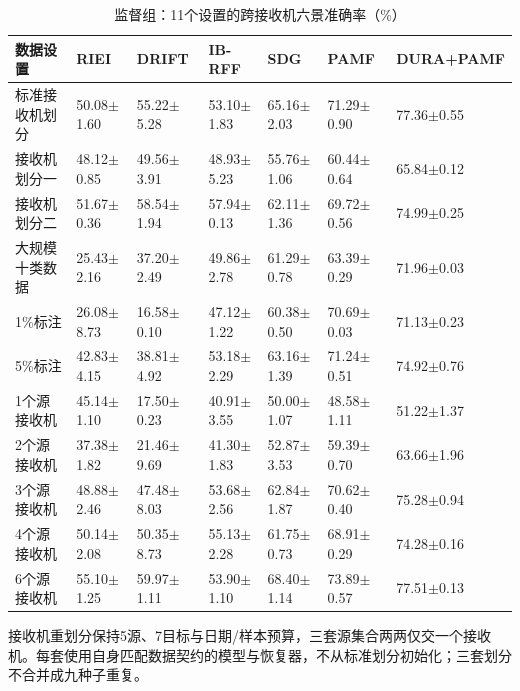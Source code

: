 \documentclass[10pt,journal]{IEEEtran}
\begin{document}
\begin{table}[!tbp]
\caption{监督组：11个设置的跨接收机六景准确率（\%）}
\label{tab:grouped-5}
\centering
\small
\begin{tabularx}{\textwidth}{YYYYYYY}
\toprule
\textbf{数据设置} & \textbf{RIEI} & \textbf{DRIFT} & \textbf{IB-RFF} & \textbf{SDG} & \textbf{PAMF} & \textbf{DURA+PAMF} \\
\midrule
标准接收机划分 & 50.08\ensuremath{\pm}1.60 & 55.22\ensuremath{\pm}5.28 & 53.10\ensuremath{\pm}1.83 & 65.16\ensuremath{\pm}2.03 & 71.29\ensuremath{\pm}0.90 & 77.36\ensuremath{\pm}0.55 \\
接收机划分一 & 48.12\ensuremath{\pm}0.85 & 49.56\ensuremath{\pm}3.91 & 48.93\ensuremath{\pm}5.23 & 55.76\ensuremath{\pm}1.06 & 60.44\ensuremath{\pm}0.64 & 65.84\ensuremath{\pm}0.12 \\
接收机划分二 & 51.67\ensuremath{\pm}0.36 & 58.54\ensuremath{\pm}1.94 & 57.94\ensuremath{\pm}0.13 & 62.11\ensuremath{\pm}1.36 & 69.72\ensuremath{\pm}0.56 & 74.99\ensuremath{\pm}0.25 \\
大规模十类数据 & 25.43\ensuremath{\pm}2.16 & 37.20\ensuremath{\pm}2.49 & 49.86\ensuremath{\pm}2.78 & 61.29\ensuremath{\pm}0.78 & 63.39\ensuremath{\pm}0.29 & 71.96\ensuremath{\pm}0.03 \\
1\%标注 & 26.08\ensuremath{\pm}8.73 & 16.58\ensuremath{\pm}0.10 & 47.12\ensuremath{\pm}1.22 & 60.38\ensuremath{\pm}0.50 & 70.69\ensuremath{\pm}0.03 & 71.13\ensuremath{\pm}0.23 \\
5\%标注 & 42.83\ensuremath{\pm}4.15 & 38.81\ensuremath{\pm}4.92 & 53.18\ensuremath{\pm}2.29 & 63.16\ensuremath{\pm}1.39 & 71.24\ensuremath{\pm}0.51 & 74.92\ensuremath{\pm}0.76 \\
1个源接收机 & 45.14\ensuremath{\pm}1.10 & 17.50\ensuremath{\pm}0.23 & 40.91\ensuremath{\pm}3.55 & 50.00\ensuremath{\pm}1.07 & 48.58\ensuremath{\pm}1.11 & 51.22\ensuremath{\pm}1.37 \\
2个源接收机 & 37.38\ensuremath{\pm}1.82 & 21.46\ensuremath{\pm}9.69 & 41.30\ensuremath{\pm}1.83 & 52.87\ensuremath{\pm}3.53 & 59.39\ensuremath{\pm}0.70 & 63.66\ensuremath{\pm}1.96 \\
3个源接收机 & 48.88\ensuremath{\pm}2.46 & 47.48\ensuremath{\pm}8.03 & 53.68\ensuremath{\pm}2.56 & 62.84\ensuremath{\pm}1.87 & 70.62\ensuremath{\pm}0.40 & 75.28\ensuremath{\pm}0.94 \\
4个源接收机 & 50.14\ensuremath{\pm}2.08 & 50.35\ensuremath{\pm}8.73 & 55.13\ensuremath{\pm}2.28 & 61.75\ensuremath{\pm}0.73 & 68.91\ensuremath{\pm}0.29 & 74.28\ensuremath{\pm}0.16 \\
6个源接收机 & 55.10\ensuremath{\pm}1.25 & 59.97\ensuremath{\pm}1.11 & 53.90\ensuremath{\pm}1.10 & 68.40\ensuremath{\pm}1.14 & 73.89\ensuremath{\pm}0.57 & 77.51\ensuremath{\pm}0.13 \\
\bottomrule
\end{tabularx}
\end{table}
接收机重划分保持5源、7目标与日期/样本预算，三套源集合两两仅交一个接收机。每套使用自身匹配数据契约的模型与恢复器，不从标准划分初始化；三套划分不合并成九种子重复。
\end{document}
